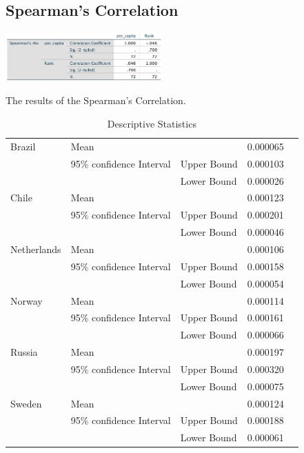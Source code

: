 \documentclass[conference]{IEEEtran}
\begin{document}
\subsection{Spearman's Correlation}

\begin{table}[b]
    \centering
    \includegraphics[width=0.45\textwidth]{spearmans}
    \caption{The results of the Spearman's Correlation.}
\end{table}

\begin{table}[ht]
    \centering
    \caption{Descriptive Statistics}
    \begin{tabular}{| l | l | lll |}
    \hline
     Brazil&  Mean&  &  0.000065&   \\
     &  95\% confidence Interval&  Upper Bound&  0.000103&   \\
     &  &  Lower Bound&  0.000026&   \\
     Chile&  Mean&  &  0.000123&   \\
     &  95\% confidence Interval&  Upper Bound&  0.000201&   \\
     &  &  Lower Bound&  0.000046&   \\
     Netherlands&  Mean&  &  0.000106&   \\
     &  95\% confidence Interval&  Upper Bound& 0.000158&   \\
     &  &  Lower Bound&  0.000054&   \\
     Norway&  Mean&  &  0.000114&   \\
     &  95\% confidence Interval&  Upper Bound&  0.000161&   \\
     &  &  Lower Bound&  0.000066&   \\
     Russia&  Mean&  &  0.000197&   \\
     &  95\% confidence Interval&  Upper Bound&  0.000320&   \\
     &  &  Lower Bound&  0.000075&   \\
     Sweden&  Mean&  &  0.000124&   \\
     &  95\% confidence Interval&  Upper Bound&  0.000188&   \\
     &  &  Lower Bound&  0.000061& \\\hline
    \end{tabular}
    \end{table}
\end{document}
